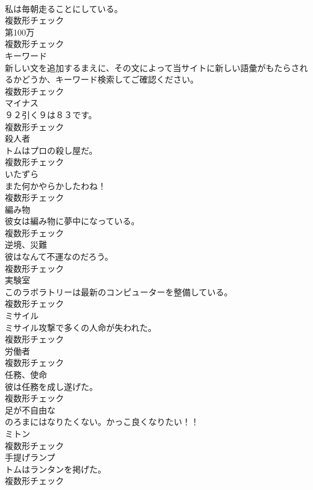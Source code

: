 \documentclass[8pt]{extreport}
\begin{document}
\begin{CJK}{UTF8}{min}
\\	私は毎朝走ることにしている。	
\\	複数形チェック
\\	[名詞]	第100万	
\\	複数形チェック
\\	[名詞]	キーワード	
\\	新しい文を追加するまえに、その文によって当サイトに新しい語彙がもたらされるかどうか、キーワード検索してご確認ください。	
\\	複数形チェック
\\	[名詞]	マイナス	
\\	９２引く９は８３です。	
\\	複数形チェック
\\	[名詞]	殺人者	
\\	トムはプロの殺し屋だ。	
\\	複数形チェック
\\	[名詞]	いたずら	
\\	また何かやらかしたわね！	
\\	複数形チェック
\\	[名詞]	編み物	
\\	彼女は編み物に夢中になっている。	
\\	複数形チェック
\\	[名詞]	逆境、災難	
\\	彼はなんて不運なのだろう。	
\\	複数形チェック
\\	[名詞]	実験室	
\\	このラボラトリーは最新のコンピューターを整備している。	
\\	複数形チェック
\\	[名詞]	ミサイル	
\\	ミサイル攻撃で多くの人命が失われた。	
\\	複数形チェック
\\	[名詞]	労働者	
\\	複数形チェック
\\	[名詞]	任務、使命	
\\	彼は任務を成し遂げた。	
\\	複数形チェック
\\	[形容詞]	足が不自由な	
\\	のろまにはなりたくない。かっこ良くなりたい！！	
\\	[名詞]	ミトン	
\\	複数形チェック
\\	[名詞]	手提げランプ	
\\	トムはランタンを掲げた。	
\\	複数形チェック

\end{CJK}
\end{document}
